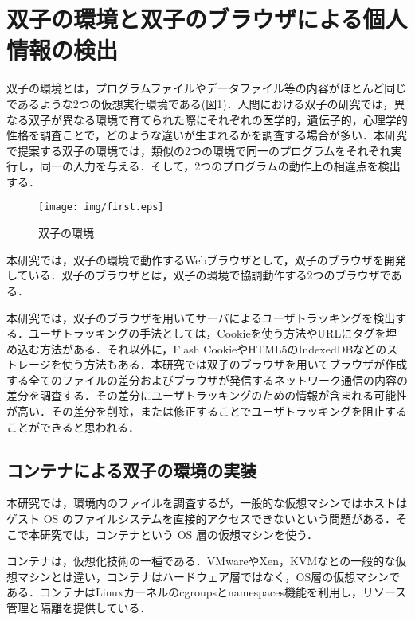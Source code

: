 \documentclass[submit,techrep]{ipsj}
\begin{document}
\section{双子の環境と双子のブラウザによる個人情報の検出}
\label{twinsBrowser}
双子の環境とは，プログラムファイルやデータファイル等の内容がほとんど同じであるような2つの仮想実行環境である(図1)．人間における双子の研究では，異なる双子が異なる環境で育てられた際にそれぞれの医学的，遺伝子的，心理学的性格を調査ことで，どのような違いが生まれるかを調査する場合が多い．本研究で提案する双子の環境では，類似の2つの環境で同一のプログラムをそれぞれ実行し，同一の入力を与える．そして，2つのプログラムの動作上の相違点を検出する．

\begin{figure}[t]
\begin{center}
\texttt{[image: img/first.eps]}
\caption{双子の環境}
\label{figure:twin}
\end{center}
\end{figure}



本研究では，双子の環境で動作するWebブラウザとして，双子のブラウザを開発している\cite{comsys}．双子のブラウザとは，双子の環境で協調動作する2つのブラウザである．

本研究では，双子のブラウザを用いてサーバによるユーザトラッキングを検出する．ユーザトラッキングの手法としては，Cookieを使う方法やURLにタグを埋め込む方法がある．それ以外に，Flash CookieやHTML5のIndexedDBなどのストレージを使う方法もある．本研究では双子のブラウザを用いてブラウザが作成する全てのファイルの差分およびブラウザが発信するネットワーク通信の内容の差分を調査する．その差分にユーザトラッキングのための情報が含まれる可能性が高い．その差分を削除，または修正することでユーザトラッキングを阻止することができると思われる．




\subsection{コンテナによる双子の環境の実装}
本研究では，環境内のファイルを調査するが，一般的な仮想マシンではホストはゲスト OS のファイルシステムを直接的アクセスできないという問題がある．そこで本研究では，コンテナという OS 層の仮想マシンを使う．

コンテナは，仮想化技術の一種である．VMwareやXen，KVMなとの一般的な仮想マシンとは違い，コンテナはハードウェア層ではなく，OS層の仮想マシンである．コンテナはLinuxカーネルのcgroupsとnamespaces機能を利用し，リソース管理と隔離を提供している．
\end{document}
